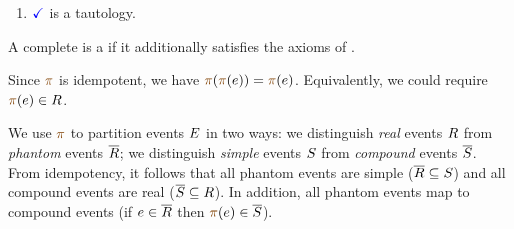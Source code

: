 \begin{definition}
\begin{multicols}{2}
\begin{enumerate}[,label=(\textsc{c}\arabic*),ref=\textsc{c}\arabic*]
      \setcounter{enumi}{\value{Bterm}}
    \item \label{top-term-c11}
      $\aTerm$ is a tautology.
    \end{enumerate}
  \end{multicols}

  A complete \PwTpo{} is a \PwTc{} if it additionally satisfies the axioms of
  \rcXI{}.
\end{definition}
Since $\fmrg{}$ is idempotent, we have $\fmrg{\fmrg{\aEv}} = \fmrg{\aEv}$.
Equivalently, we could require $\fmrg{\aEv}\in\reEvs$.

We use $\fmrg{}$ to partition events $E$ in two ways: we distinguish
\emph{real} events $R$ from \emph{phantom} events $\overline{R}$; we
distinguish \emph{simple} events $S$ from \emph{compound} events
$\overline{S}$.   From idempotency, it follows that all phantom events are simple
($\overline{R}\subseteq S$) and all compound events are real
($\overline{S}\subseteq R$).  In addition, all phantom events map to compound
events (if $e\in\overline{R}$ then $\fmrg{\aEv}\in\dmEvs$).


